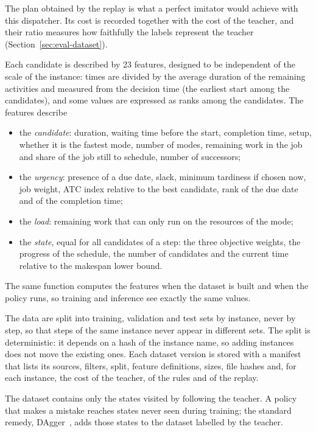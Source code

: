The plan obtained by the replay is what a perfect imitator would achieve with this dispatcher.
Its cost is recorded together with the cost of the teacher, and their ratio measures how
faithfully the labels represent the teacher (Section~\ref{sec:eval-dataset}).

Each candidate is described by 23 features, designed to be independent of the scale of the
instance: times are divided by the average duration of the remaining activities and measured
from the decision time (the earliest start among the candidates), and some values are expressed
as ranks among the candidates. The features describe
\begin{itemize}
  \item the \emph{candidate}: duration, waiting time before the start, completion time, setup,
        whether it is the fastest mode, number of modes, remaining work in the job and share of
        the job still to schedule, number of successors;
  \item the \emph{urgency}: presence of a due date, slack, minimum tardiness if chosen now, job
        weight, ATC index relative to the best candidate, rank of the due date and of the
        completion time;
  \item the \emph{load}: remaining work that can only run on the resources of the mode;
  \item the \emph{state}, equal for all candidates of a step: the three objective weights, the
        progress of the schedule, the number of candidates and the current time relative to the
        makespan lower bound.
\end{itemize}
The same function computes the features when the dataset is built and when the policy runs, so
training and inference see exactly the same values.

The data are split into training, validation and test sets by instance, never by step, so that
steps of the same instance never appear in different sets. The split is deterministic: it
depends on a hash of the instance name, so adding instances does not move the existing ones.
Each dataset version is stored with a manifest that lists its sources, filters, split, feature
definitions, sizes, file hashes and, for each instance, the cost of the teacher, of the rules
and of the replay.

The dataset contains only the states visited by following the teacher. A policy that makes a
mistake reaches states never seen during training; the standard remedy, DAgger~\cite{ross2011dagger},
adds those states to the dataset labelled by the teacher.
